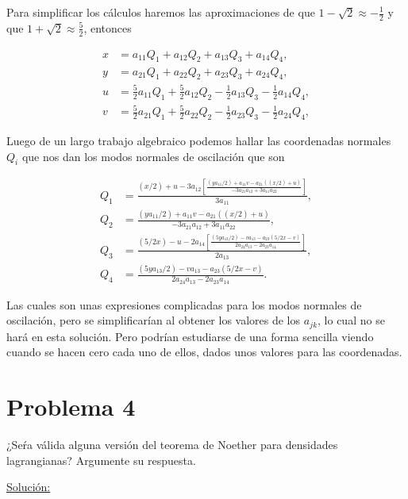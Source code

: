 \documentclass[a4paper,10pt]{article}
\numberwithin{equation}{section}
\begin{document}
Para simplificar los cálculos haremos las aproximaciones de que $1-\sqrt{2}\approx -\frac{1}{2}$ 
y que $1+\sqrt{2}\approx \frac{5}{2}$, entonces 

\begin{align}
 x &= a_{11}Q_1 + a_{12}Q_2 + a_{13}Q_3 + a_{14}Q_4, \\
 y &= a_{21}Q_1 + a_{22}Q_2 + a_{23}Q_3 + a_{24}Q_4, \\
 u &= \frac{5}{2}a_{11}Q_1 + \frac{5}{2}a_{12}Q_2 - \frac{1}{2}a_{13}Q_3 - \frac{1}{2} a_{14}Q_4, \\
 v &= \frac{5}{2}a_{21}Q_1 + \frac{5}{2}a_{22}Q_2 - \frac{1}{2}a_{23}Q_3 - \frac{1}{2}a_{24}Q_4,
\end{align}

Luego de un largo trabajo algebraico podemos hallar las coordenadas normales $Q_i$ que 
nos dan los modos normales de oscilación que son

\begin{align}
 Q_1 &= \frac{(x/2) + u - 3a_{12}\left[\frac{(ya_{11}/2) + a_{11}v - a_{21}((x/2)+u)}{-3a_{21}a_{12} + 3a_{11}a_{22}}\right]}{3a_{11}}, \\
 Q_2 &= \frac{(ya_{11}/2) + a_{11}v - a_{21}((x/2)+u)}{-3a_{21}a_{12} + 3a_{11}a_{22}}, \\
 Q_3 &= \frac{(5/2x) - u - 2a_{14}\left[  \frac{(5ya_{13}/2) - va_{13} - a_{23}(5/2x-v)}{2a_{24}a_{13} - 2a_{23}a_{14}}\right]}{2a_{13}}, \\
 Q_4 &= \frac{(5ya_{13}/2) - va_{13} - a_{23}(5/2x-v)}{2a_{24}a_{13} - 2a_{23}a_{14}}.
\end{align}

Las cuales son unas expresiones complicadas para los modos normales de oscilación, 
pero se simplificarían al obtener los valores de los $a_{jk}$, lo cual no se hará
en esta solución. Pero podrían estudiarse de una forma sencilla viendo cuando se hacen 
cero cada uno de ellos, dados unos valores para las coordenadas. 

\section{Problema 4}

¿Seŕa válida alguna versión del teorema de Noether para densidades lagrangianas? Argumente 
su respuesta.

\vspace{.3cm}

\underline{Solución:} \vspace{.3cm}
\end{document}
